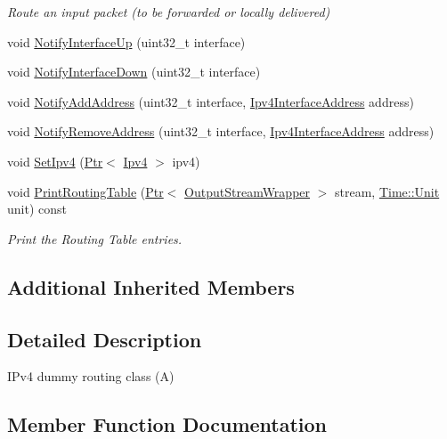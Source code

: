 \begin{DoxyCompactItemize}
\begin{DoxyCompactList}\small\item\em Route an input packet (to be forwarded or locally delivered) \end{DoxyCompactList}\item 
void \hyperlink{classIpv4ARouting_a5ebb5358fb280a594ab6cc8434d4658f}{Notify\+Interface\+Up} (uint32\+\_\+t interface)
\item 
void \hyperlink{classIpv4ARouting_a6583e7d9c2373fe51d1c65689962fc4c}{Notify\+Interface\+Down} (uint32\+\_\+t interface)
\item 
void \hyperlink{classIpv4ARouting_ac523a0ca03a0349583e3ba8d80cbb649}{Notify\+Add\+Address} (uint32\+\_\+t interface, \hyperlink{classns3_1_1Ipv4InterfaceAddress}{Ipv4\+Interface\+Address} address)
\item 
void \hyperlink{classIpv4ARouting_aa976516ac37412365d98838718a1a09b}{Notify\+Remove\+Address} (uint32\+\_\+t interface, \hyperlink{classns3_1_1Ipv4InterfaceAddress}{Ipv4\+Interface\+Address} address)
\item 
void \hyperlink{classIpv4ARouting_af5adcc0186259a1d3f46bc12efd62f3b}{Set\+Ipv4} (\hyperlink{classns3_1_1Ptr}{Ptr}$<$ \hyperlink{classns3_1_1Ipv4}{Ipv4} $>$ ipv4)
\item 
void \hyperlink{classIpv4ARouting_ab78a61a72067edee90f0d1780cfa9044}{Print\+Routing\+Table} (\hyperlink{classns3_1_1Ptr}{Ptr}$<$ \hyperlink{classns3_1_1OutputStreamWrapper}{Output\+Stream\+Wrapper} $>$ stream, \hyperlink{classns3_1_1Time_a87a7f4d29c68b047a72d291ad660295a}{Time\+::\+Unit} unit) const 
\begin{DoxyCompactList}\small\item\em Print the Routing Table entries. \end{DoxyCompactList}\end{DoxyCompactItemize}
\subsection*{Additional Inherited Members}


\subsection{Detailed Description}
I\+Pv4 dummy routing class (A) 

\subsection{Member Function Documentation}

